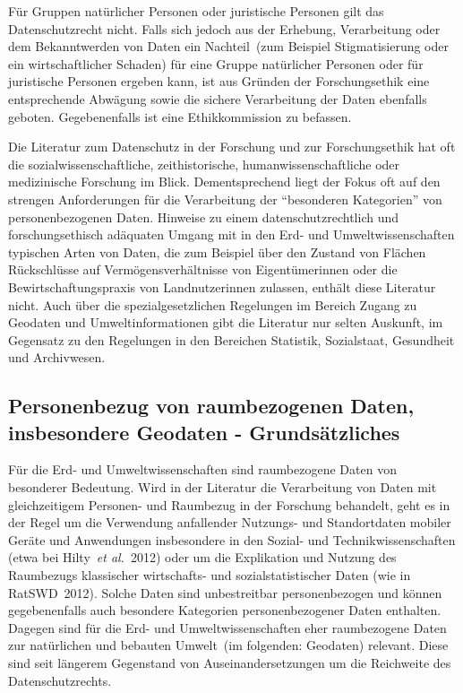\documentclass[a4paper,
fontsize=11pt,
oneside,
numbers=noperiodatend,
parskip=half-,
bibliography=totoc,
final
]{scrartcl}
\begin{document}
Für Gruppen natürlicher Personen oder juristische Personen gilt das
Datenschutzrecht nicht. Falls sich jedoch aus der Erhebung, Verarbeitung
oder dem Bekanntwerden von Daten ein Nachteil~(zum Beispiel
Stigmatisierung oder ein wirtschaftlicher Schaden) für eine Gruppe
natürlicher Personen oder für juristische Personen ergeben kann, ist aus
Gründen der Forschungsethik eine entsprechende Abwägung sowie die
sichere Verarbeitung der Daten ebenfalls geboten. Gegebenenfalls ist
eine Ethikkommission zu befassen.

Die Literatur zum Datenschutz in der Forschung und zur Forschungsethik
hat oft die sozialwissenschaftliche, zeithistorische,
humanwissenschaftliche oder medizinische Forschung im Blick.
Dementsprechend liegt der Fokus oft auf den strengen Anforderungen für
die Verarbeitung der \enquote{besonderen Kategorien} von
personenbezogenen Daten. Hinweise zu einem datenschutzrechtlich und
forschungsethisch adäquaten Umgang mit in den Erd- und
Umweltwissenschaften typischen Arten von Daten, die zum Beispiel über
den Zustand von Flächen Rückschlüsse auf Vermögensverhältnisse von
Eigentümerinnen oder die Bewirtschaftungspraxis von Landnutzerinnen
zulassen, enthält diese Literatur nicht. Auch über die
spezialgesetzlichen Regelungen im Bereich Zugang zu Geodaten und
Umweltinformationen gibt die Literatur nur selten Auskunft, im Gegensatz
zu den Regelungen in den Bereichen Statistik, Sozialstaat, Gesundheit
und Archivwesen.

\hypertarget{personenbezug-von-raumbezogenen-daten-insbesondere-geodaten---grundsuxe4tzliches}{%
\subsection{Personenbezug von raumbezogenen Daten, insbesondere Geodaten
-
Grundsätzliches}\label{personenbezug-von-raumbezogenen-daten-insbesondere-geodaten---grundsuxe4tzliches}}

Für die Erd- und Umweltwissenschaften sind raumbezogene Daten von
besonderer Bedeutung. Wird in der Literatur die Verarbeitung von Daten
mit gleichzeitigem Personen- und Raumbezug in der Forschung behandelt,
geht es in der Regel um die Verwendung anfallender Nutzungs- und
Standortdaten mobiler Geräte und Anwendungen insbesondere in den Sozial-
und Technikwissenschaften (etwa bei Hilty~\emph{et al.}~2012) oder um
die Explikation und Nutzung des Raumbezugs klassischer wirtschafts- und
sozialstatistischer Daten (wie in RatSWD~2012). Solche Daten sind
unbestreitbar personenbezogen und können gegebenenfalls auch besondere
Kategorien personenbezogener Daten enthalten. Dagegen sind für die Erd-
und Umweltwissenschaften eher raumbezogene Daten zur natürlichen und
bebauten Umwelt~(im folgenden: Geodaten) relevant. Diese sind seit
längerem Gegenstand von Auseinandersetzungen um die Reichweite des
Datenschutzrechts.
\end{document}
